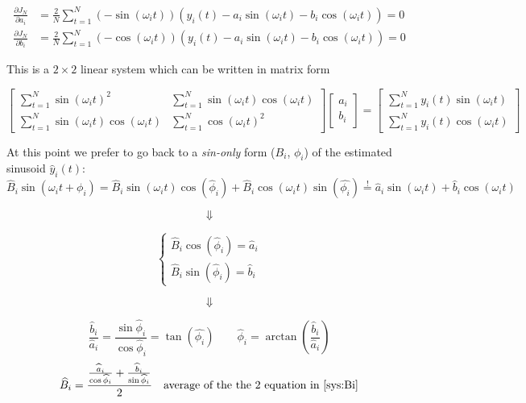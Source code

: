 
\begin{align*}
    \frac{\partial J_N}{\partial a_i} &= \frac{2}{N} \sum_{t=1}^N (-\sin(\omega_it))(y_i(t) - a_i\sin(\omega_it)-b_i\cos(\omega_it)) = 0 \\
    \frac{\partial J_N}{\partial b_i} &= \frac{2}{N} \sum_{t=1}^N (-\cos(\omega_it))(y_i(t) - a_i\sin(\omega_it)-b_i\cos(\omega_it)) = 0
\end{align*}

This is a $2 \times 2$ linear system which can be written in matrix form

\[
    \begin{bmatrix}
        \sum_{t=1}^N \sin(\omega_it)^2 & \sum_{t=1}^N \sin(\omega_it)\cos(\omega_it) \\
        \sum_{t=1}^N \sin(\omega_it)\cos(\omega_it) & \sum_{t=1}^N \cos(\omega_it)^2
    \end{bmatrix}
    \begin{bmatrix}
        a_i \\ b_i
    \end{bmatrix} =
    \begin{bmatrix}
        \sum_{t=1}^N y_i(t)\sin(\omega_it) \\
        \sum_{t=1}^N y_i(t)\cos(\omega_it)
    \end{bmatrix}
\]

At this point we prefer to go back to a \emph{sin-only} form ($B_i$, $\phi_i$) of the estimated sinusoid $\hat{y}_i(t)$:
\[
    \hat{B}_i\sin(\omega_it + \phi_i) = \hat{B}_i\sin(\omega_it)\cos(\hat{\phi}_i) + \hat{B}_i\cos(\omega_it)\sin(\hat{\phi_i}) \stackrel{\text{!}}{=} \hat{a}_i\sin(\omega_it) + \hat{b}_i\cos(\omega_it)
\]

\[\Downarrow\]

\[
    \begin{cases}\label{sys:Bi}\tag{$\bigstar$}
         \hat{B}_i\cos(\hat{\phi}_i) = \hat{a}_i  \\
         \hat{B}_i\sin(\hat{\phi}_i) = \hat{b}_i 
    \end{cases}
\]

\[\Downarrow\]

\[
    \frac{\hat{b}_i}{\hat{a}_i} = \frac{\sin\hat{\phi}_i}{\cos{\hat{\phi}_i}} = \tan(\hat{\phi_i}) \qquad \hat{\phi}_i = \arctan \left( \frac{\hat{b}_i}{\hat{a}_i} \right)
\]
\[
    \hat{B}_i = \frac{\frac{\hat{a}_i}{\cos\hat{\phi}_i} + \frac{\hat{b}_i}{\sin\hat{\phi}_i}}{2} \quad \text{average of the the 2 equation in \eqref{sys:Bi}}
\]


